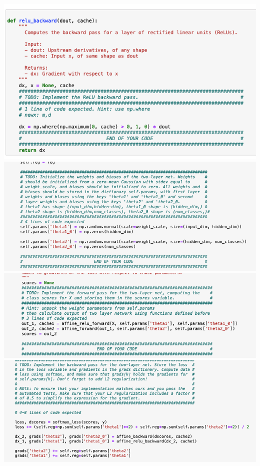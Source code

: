 \documentclass[11pt]{article}
\begin{document}
\includegraphics[scale= 0.35]{hw8-4} \\
\includegraphics[scale= 0.35]{hw8-5} \\
\includegraphics[scale= 0.35]{hw8-6} \\
\includegraphics[scale= 0.35]{hw8-7} \\
\end{document}
